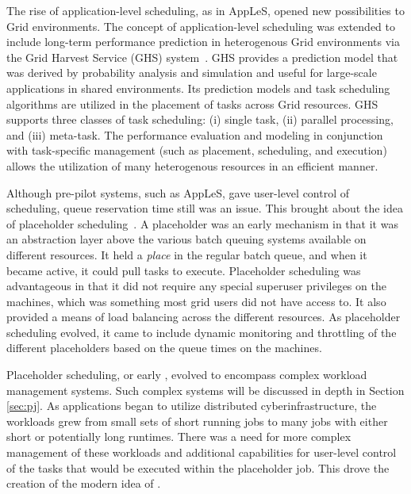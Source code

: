 \documentclass{sig-alternate}
\begin{document}
The rise of application-level scheduling, as in AppLeS, opened new
possibilities to Grid environments. The concept of application-level
scheduling was extended to include long-term performance prediction in
heterogenous Grid environments via the Grid Harvest Service (GHS)
system~\cite{ghs}. GHS provides a prediction model that was derived by
probability analysis and simulation and useful for large-scale
applications in shared environments. Its prediction models and task
scheduling algorithms are utilized in the placement of tasks across
Grid resources. GHS supports three classes of task scheduling: (i)
single task, (ii) parallel processing, and (iii) meta-task. The
performance evaluation and modeling in conjunction with task-specific
management (such as placement, scheduling, and execution) allows the
utilization of many heterogenous resources in an efficient manner.

Although pre-pilot systems, such as AppLeS, gave user-level control of
scheduling, queue reservation time still was an issue. This brought
about the idea of placeholder
scheduling~\cite{Pinchak02practicalheterogeneous,
  Singh:2008:WTC:1341811.1341822}. A placeholder was an early \pilot
mechanism in that it was an abstraction layer above the various batch
queuing systems available on different resources. It held a
\textit{place} in the regular batch queue, and when it became active,
it could pull tasks to execute.  Placeholder scheduling was
advantageous in that it did not require any special superuser
privileges on the machines, which was something most grid users did
not have access to. It also provided a means of load balancing across
the different resources. As placeholder scheduling evolved, it came to
include dynamic monitoring and throttling of the different
placeholders based on the queue times on the machines.

Placeholder scheduling, or early \pilots, evolved to encompass complex
workload management systems. Such complex systems will be discussed in
depth in Section \ref{sec:pj}. As applications began to utilize
distributed cyberinfrastructure, the workloads grew from small sets of
short running jobs to many jobs with either short or potentially long
runtimes. There was a need for more complex management of these
workloads and additional capabilities for user-level control of the
tasks that would be executed within the placeholder job. This drove
the creation of the modern idea of \pilots.
 
\end{document}
